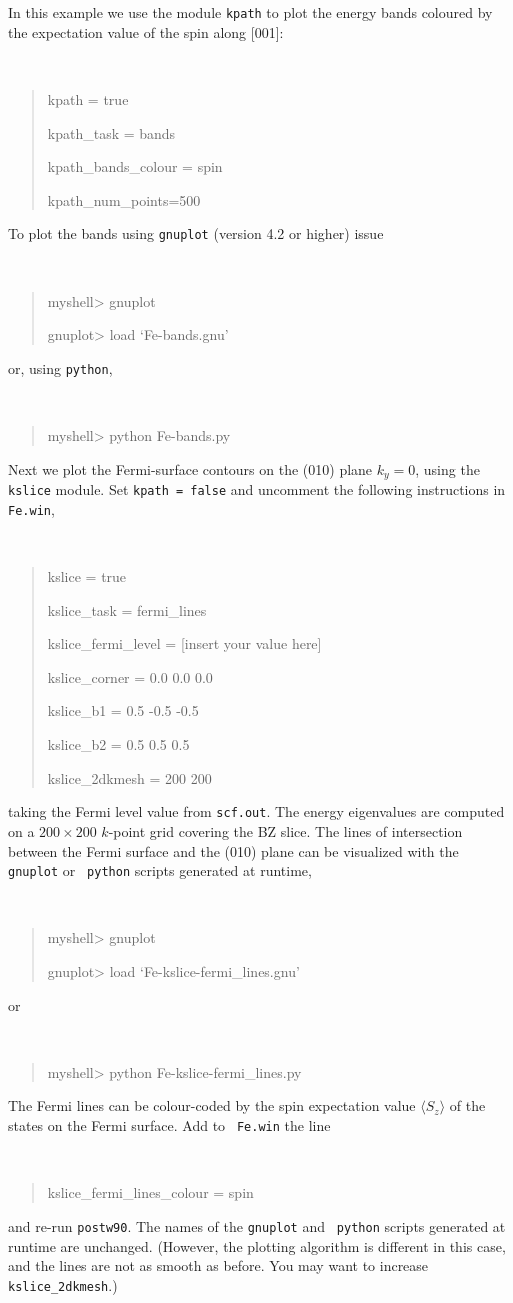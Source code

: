 \documentclass[a4paper,11pt,twoside]{article}
\begin{document}
 In this example we use the module {\tt kpath} to plot the energy
  bands coloured by the expectation value of the spin along [001]:
  {\tt
\begin{quote}
kpath = true

kpath\_task = bands

kpath\_bands\_colour = spin     

kpath\_num\_points=500
\end{quote} }


To plot the bands using {\tt gnuplot} (version 4.2 or higher) issue
%
{\tt
\begin{quote}
myshell> gnuplot

gnuplot> load `Fe-bands.gnu'
\end{quote} }
%
or, using {\tt python},
%
{\tt
\begin{quote}
myshell> python Fe-bands.py
\end{quote} }

Next we plot the Fermi-surface contours on the (010) plane $k_y=0$,
using the {\tt kslice} module. Set {\tt kpath = false} and uncomment
the following instructions in {\tt Fe.win}, 
%
{\tt
\begin{quote}
kslice = true

kslice\_task = fermi\_lines

kslice\_fermi\_level = [insert your value here] 

kslice\_corner = 0.0  0.0  0.0

kslice\_b1 =     0.5 -0.5 -0.5

kslice\_b2 =     0.5  0.5  0.5

kslice\_2dkmesh = 200 200
\end{quote} }

taking the Fermi level value from {\tt scf.out}. The energy
eigenvalues are computed on a $200\times 200$ $k$-point grid covering
the BZ slice. The lines of intersection between the Fermi surface and
the (010) plane can be visualized with the {\tt gnuplot} or {\tt
  python} scripts generated at runtime,
%
{\tt
\begin{quote}
myshell> gnuplot

gnuplot> load `Fe-kslice-fermi\_lines.gnu'
\end{quote} }
%
or 
%
{\tt
\begin{quote}
myshell> python Fe-kslice-fermi\_lines.py
\end{quote} }
%
The Fermi lines can be colour-coded by the spin expectation value
$\langle S_z\rangle$ of the states on the Fermi surface. Add to {\tt
  Fe.win} the line {\tt
\begin{quote}
kslice\_fermi\_lines\_colour = spin
\end{quote} }
%
and re-run {\tt postw90}. The names of the {\tt gnuplot} and {\tt
  python} scripts generated at runtime are unchanged. (However, the
plotting algorithm is different in this case, and the lines are not as
smooth as before. You may want to increase {\tt kslice\_2dkmesh}.)
\end{document}
